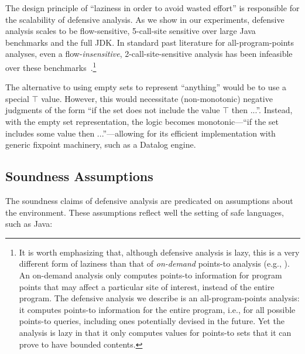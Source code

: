 The design principle of ``laziness in order to avoid wasted effort'' is responsible for the scalability of defensive analysis. As we show in our experiments, defensive analysis scales to be flow-sensitive, 5-call-site sensitive over large Java benchmarks and the full JDK. In standard past literature for all-program-points analyses, even a flow-\emph{insensitive}, 2-call-site-sensitive analysis has been
infeasible over these benchmarks~\cite{pldi:2014:Smaragdakis}.\footnote{It is worth emphasizing that, although defensive analysis is lazy, this is a very different form of laziness than that of \emph{on-demand} points-to analysis (e.g., \cite{ecoop:2016:Spath,popl:1997:Biswas}). An on-demand analysis only computes points-to information for program points that may affect a particular site of interest, instead of the entire program. The defensive analysis we describe is an all-program-points analysis: it computes points-to information for the entire program, i.e., for all possible points-to queries, including ones potentially devised in the future. Yet the analysis is lazy in that it only computes values for points-to sets that it can prove to have bounded contents.}

The alternative to using empty sets to represent ``anything'' would be to use a special $\top$ value. However, this would necessitate (non-monotonic) negative judgments of the form ``if the set does not include the value $\top$ then ...''. Instead, with the empty set representation, the logic becomes monotonic---``if the set includes some value then ...''---allowing for its efficient implementation with generic fixpoint machinery, such as a Datalog engine.


\subsection{Soundness Assumptions}
\label{sec:sound:assumptions}

The soundness claims of defensive analysis are predicated on assumptions about the environment. These assumptions reflect well the setting of safe languages, such as Java:


